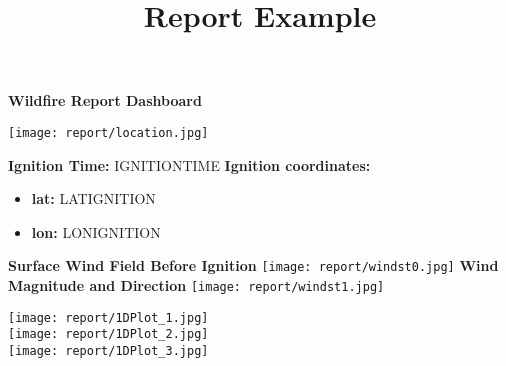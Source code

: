 \documentclass{article}%
\title{Report Example}%
\date{}%
\begin{document}
%
\begin{center}
	\LARGE \textbf{Wildfire Report Dashboard}
\end{center}
\vspace{1em}
\begin{multicols}{2}
\begin{tcolorbox}[
	title=Wildfire Ignition,
	colframe=black,
	width=\linewidth,
	boxsep=2pt,      %
	left=2pt, right=2pt, top=2pt, bottom=2pt,
	fonttitle=\Large
	]

	{\centering \texttt{[image: report/location.jpg]}	}
	\vspace{1em}
	\newline
	{
		{{\bf Ignition Time: }}
	 IGNITIONTIME
		\newline 
		\vspace{1em} 
		\newline 
		{{\bf Ignition coordinates:}} 
		\begin{itemize}
			\item{\bf lat:} LATIGNITION
			\item {\bf lon:} LONIGNITION
		\end{itemize}
	}
\end{tcolorbox}
	
	\begin{tcolorbox}[title=Meteorology, width=\linewidth, colframe=black,fonttitle=\Large]
		 \textbf{Surface Wind Field Before Ignition}
			\centering \texttt{[image: report/windst0.jpg]}
		\vspace{1em}
		 \textbf{Wind Magnitude and Direction}
			\centering  \texttt{[image: report/windst1.jpg]}
	\end{tcolorbox}
\end{multicols}

	\begin{tcolorbox}[title=Fire activity, width=\linewidth, colframe=black,fonttitle=\Large]
     \centering%
     \texttt{[image:  report/1DPlot\_1.jpg]}%
     \\
     \centering%
     \texttt{[image:  report/1DPlot\_2.jpg]}%
      \\
     \centering%
     \texttt{[image:  report/1DPlot\_3.jpg]}%
      \\
	\end{tcolorbox}
\end{document}
